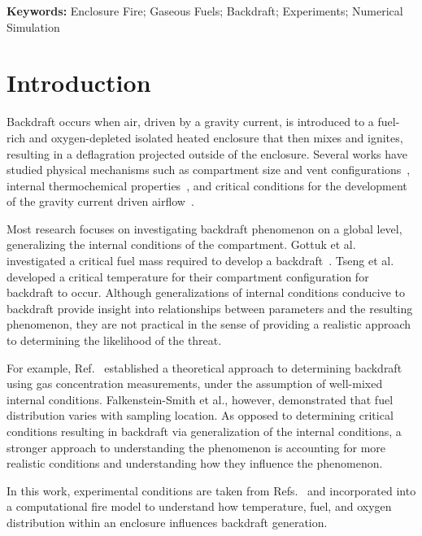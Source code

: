 \documentclass[12pt,letterpaper]{article}
\begin{document}
\begin{flushleft}
\textbf{Keywords:}
Enclosure Fire; Gaseous Fuels; Backdraft; Experiments; Numerical Simulation

\section{Introduction} \addvspace{10pt}
\label{sec:introduction}
Backdraft occurs when air, driven by a gravity current, is introduced to a fuel-rich and oxygen-depleted isolated heated enclosure that then mixes and ignites, resulting in a deflagration projected outside of the enclosure. Several works have studied physical mechanisms such as compartment size and vent configurations~\cite{weng2002study,weng2005experimental,weng2005prediction}, internal thermochemical properties~\cite{Chen2012,gong2006theoretical}, and critical conditions for the development of the gravity current driven airflow~\cite{fleischmann1993backdraft,fleischmann1994quantitative,fleischmann1993exploratory}.

Most research focuses on investigating backdraft phenomenon on a global level, generalizing the internal conditions of the compartment. Gottuk et al. investigated a critical fuel mass required to develop a backdraft~\cite{gottuk1999development,farley1997development}. Tseng et al.~\cite{tseng2024effect} developed a critical temperature for their compartment configuration for backdraft to occur. Although generalizations of internal conditions conducive to backdraft provide insight into relationships between parameters and the resulting phenomenon, they are not practical in the sense of providing a realistic approach to determining the likelihood of the threat. 

For example, Ref.~\cite{chen2011theoretical} established a theoretical approach to determining backdraft using gas concentration measurements, under the assumption of well-mixed internal conditions. Falkenstein-Smith et al., however, demonstrated that fuel distribution varies with sampling location. As opposed to determining critical conditions resulting in backdraft via generalization of the internal conditions, a stronger approach to understanding the phenomenon is accounting for more realistic conditions and understanding how they influence the phenomenon. 

In this work, experimental conditions are taken from Refs.~\cite{falkenstein2023gas,Falkenstein2022} and incorporated into a computational fire model to understand how temperature, fuel, and oxygen distribution within an enclosure influences backdraft generation. 



\end{flushleft}
\end{document}
